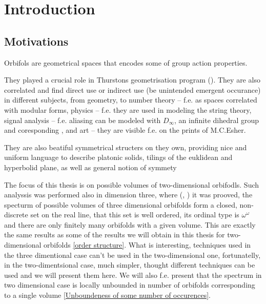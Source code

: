 \chapter{Introduction}
\setcounter{page}{9}
\section{Motivations}
Orbifols are geometrical spaces that encodes some of group action properties. 

They played a crucial role in Thurstons geometrisation program (\cite{Thurston1979}). 
They are also correlated and find direct use or indirect use (be unintended 
emergent occurance) 
in different subjects, 
from geometry, to number theory -- f.e. as spaces correlated with modular forms, 
physics -- f.e. they are used in modeling the string theory, 
signal analysis -- f.e. aliasing can be modeled with $D_\infty$, an 
infinite dihedral group and coresponding , and art -- they are visible f.e. 
on the prints of M.C.Esher.  

They are also beatiful symmetrical structers on they own, providing 
nice 
and uniform language to describe platonic solids, tilings of the euklidean 
and hyperbolid plane, 
as well as general notion of symmety


The focus of this thesis is on possible volumes of two-dimensional orbifodls.
Such analyssis was performed also in dimension three, where 
(\cite{Thurston1979}, \cite{Gromov1981}) it was prooved, the specturm of possible volumes 
of three dimensional orbifolds form a closed, non-discrete set on the real line, 
that this set is well ordered, its ordinal type is $\omega^\omega$ and there are 
only finitely many orbifolds with a given volume. This are exactly the same results 
as some of the results we will obtain in this thesis for two-dimensional orbifolds 
\ref{order structure}. 
What is interesting, techniques used in the three dimentional case can't be used in the 
two-dimensional one, fortunatelly, in the two-dimentsional case, much simpler, 
thought different techniques can be used and we will present them here. 
We will also f.e. present that the spectrum in two dimensional case is locally unbounded 
in number of orbifolds corresponding to a single volume 
\ref{Unboundeness of some number of occurences}. 

